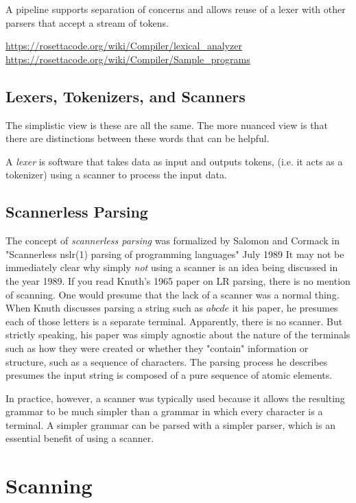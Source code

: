 \documentclass{book}
\newcommand{\newterm}[2]{\textit{#1}\index{#2}}
\begin{document}
A pipeline supports separation of concerns and allows reuse of a lexer
with other parsers that accept a stream of tokens.

\url{https://rosettacode.org/wiki/Compiler/lexical_analyzer}\\
\url{https://rosettacode.org/wiki/Compiler/Sample_programs} 


\subsection{Lexers, Tokenizers, and Scanners}
The simplistic view is these are all the same.
The more nuanced view is that there are distinctions between
these words that can be helpful.

A \newterm{lexer}{Lexer} is software that takes data as input and outputs 
tokens, (i.e. it acts as a tokenizer) using a
scanner to process the input data.


\subsection{Scannerless Parsing}

The concept of \newterm{scannerless parsing}{Scannerless Parsing} was formalized
by Salomon and Cormack in "Scannerless nslr(1) parsing of programming languages" July 1989
It may not be immediately clear why simply \textit{not} using a scanner
is an idea being discussed in the year 1989. If you read Knuth's 1965 paper on
LR parsing, there is no mention of scanning. One would presume that the lack
of a scanner was a normal thing. When Knuth discusses parsing a string such 
as $abcde$ it his paper, he presumes each of those letters is a separate 
terminal. Apparently, there is no scanner. But strictly speaking, his 
paper was simply agnostic about the nature of the 
terminals such as how they were created or whether they "contain" information
or structure, such as a sequence of characters. The parsing process
he describes presumes the input string is composed of a pure sequence 
of atomic elements.

In practice, however, a scanner was typically used because it
allows the resulting grammar to be much simpler than a grammar
in which every character is a terminal. A simpler grammar can
be parsed with a simpler parser, which is an essential benefit
of using a scanner.

\section{Scanning}
\end{document}
